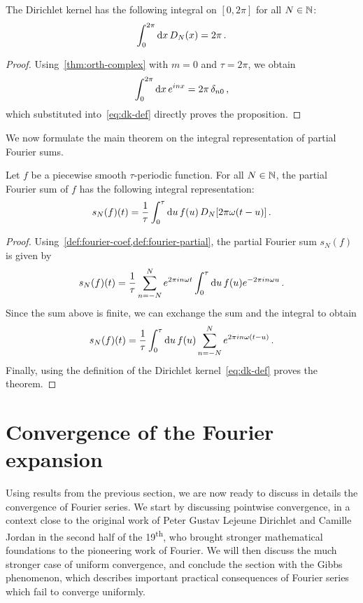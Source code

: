 \begin{proposition}
  \label{prop:dk-int}
  The Dirichlet kernel has the following integral on $[0,2\pi]$ for all $N\in\mathbb{N}$:
  \begin{equation}
    \int_0^{2\pi}\mathrm{d} x\,D_N(x)=2\pi\,.
  \end{equation}
\end{proposition}
\begin{proof}
  Using~\cref{thm:orth-complex} with $m=0$ and $\tau=2\pi$, we obtain
  \begin{equation}
    \int_{0}^{2\pi}\mathrm{d} x\,e^{inx}=2\pi\,\delta_{n0}\,,
  \end{equation}
  which substituted into~\cref{eq:dk-def} directly proves the proposition.
\end{proof}
We now formulate the main theorem on the integral representation of partial Fourier sums.
\begin{theorem}
  \label{thm:fourier-dk-rep}
  Let $f$ be a piecewise smooth $\tau$-periodic function. For all $N\in\mathbb{N}$, the
  partial Fourier sum of $f$ has the following integral representation:
  \begin{equation}
    s_N(f)(t)=\frac{1}{\tau}\int_0^{\tau}\mathrm{d} u\,f(u)\,D_N[2\pi\omega(t-u)]\,.
  \end{equation}
\end{theorem}
\begin{proof}
  Using~\cref{def:fourier-coef,def:fourier-partial}, the partial Fourier sum $s_N(f)$ is
  given by
  \begin{equation}
    s_N(f)(t)=\frac{1}{\tau}\sum_{n=-N}^{N}e^{2\pi i n\omega t}
    \int_0^\tau\mathrm{d} u\,f(u)e^{-2\pi i n\omega u}\,.
  \end{equation}
  Since the sum above is finite, we can exchange the sum and the integral to obtain
  \begin{equation}
    s_N(f)(t)=\frac{1}{\tau}\int_0^\tau\mathrm{d} u\,f(u)\sum_{n=-N}^{N}e^{2\pi i n\omega (t-u)}\,.
  \end{equation}
  Finally, using the definition of the Dirichlet kernel~\cref{eq:dk-def} proves the
  theorem.
\end{proof}
\section{Convergence of the Fourier expansion}
Using results from the previous section, we are now ready to discuss in details the
convergence of Fourier series. We start by discussing pointwise convergence, in a context
close to the original work of Peter Gustav Lejeune Dirichlet and Camille Jordan in the
second half of the 19\textsuperscript{th}, who brought stronger mathematical foundations
to the pioneering work of Fourier. We will then discuss the much stronger case of uniform
convergence, and conclude the section with the Gibbs phenomenon, which describes important
practical consequences of Fourier series which fail to converge uniformly.
